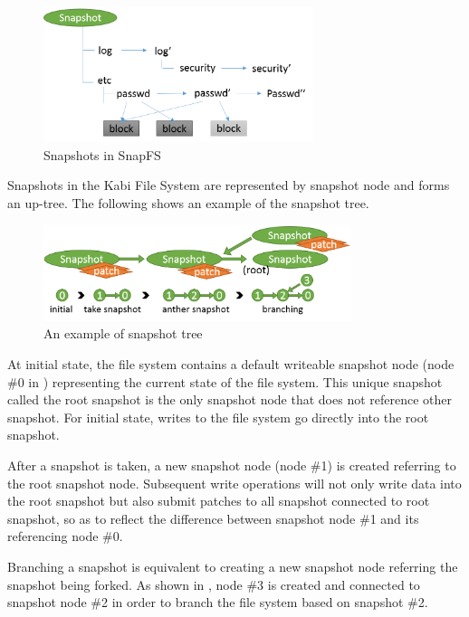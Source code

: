 \begin{figure}[hbtp]
\centering
\includegraphics[width=0.7\textwidth]{Chapter-4/figs/fig24.png}
\caption{Snapshots in SnapFS}
\label{fig:snapfs_approach}
\end{figure}

    Snapshots in the Kabi File System are represented by snapshot node and forms an up-tree. The following  shows an example of the snapshot tree.

\begin{figure}[hbtp]
\centering
\includegraphics[width=0.8\textwidth]{Chapter-4/figs/fig13.png}
\caption{An example of snapshot tree}
\label{fig:snap_tree_example}
\end{figure}

    At initial state, the file system contains a default writeable snapshot node (node \#0 in ) representing the current state of the file system. This unique snapshot called the root snapshot is the only snapshot node that does not reference other snapshot. For initial state, writes to the file system go directly into the root snapshot.
    
    After a snapshot is taken, a new snapshot node (node \#1) is created referring to the root snapshot node. Subsequent write operations will not only write data into the root snapshot but also submit patches to all snapshot connected to root snapshot, so as to reflect the difference between snapshot node \#1 and its referencing node \#0.

    Branching a snapshot is equivalent to creating a new snapshot node referring the snapshot being forked. As shown in , node \#3 is created and connected to snapshot node \#2 in order to branch the file system based on snapshot \#2.

